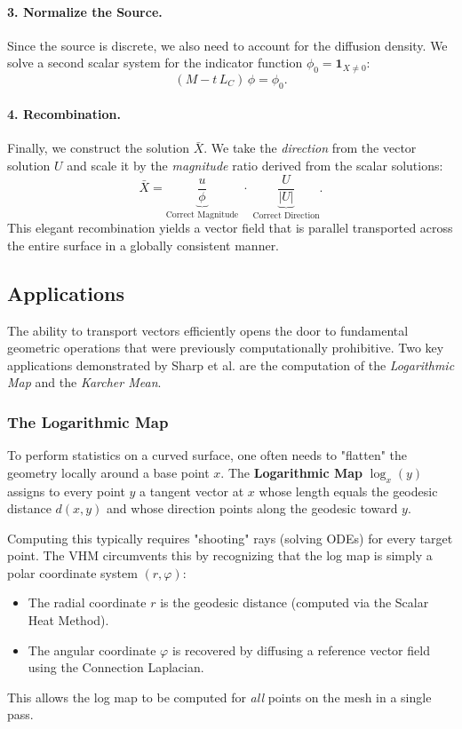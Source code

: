 \documentclass[11pt,a4paper]{article}
\begin{document}
\paragraph{3. Normalize the Source.}
Since the source is discrete, we also need to account for the diffusion density. We solve a second scalar system for the indicator function $\phi_0 = \mathbf{1}_{X\neq0}$:
\[
(M - t\,L_C)\,\phi = \phi_0.
\]

\paragraph{4. Recombination.}
Finally, we construct the solution $\bar{X}$. We take the \textit{direction} from the vector solution $U$ and scale it by the \textit{magnitude} ratio derived from the scalar solutions:
\[
\bar X = \underbrace{\frac{u}{\phi}}_{\text{Correct Magnitude}} \;\cdot\; \underbrace{\frac{U}{|U|}}_{\text{Correct Direction}}.
\]
This elegant recombination yields a vector field that is parallel transported across the entire surface in a globally consistent manner.

\subsection{Applications}

The ability to transport vectors efficiently opens the door to fundamental geometric operations that were previously computationally prohibitive. Two key applications demonstrated by Sharp et al. are the computation of the \textit{Logarithmic Map} and the \textit{Karcher Mean}.

\subsubsection{The Logarithmic Map}

To perform statistics on a curved surface, one often needs to "flatten" the geometry locally around a base point $x$. The \textbf{Logarithmic Map} $\log_x(y)$ assigns to every point $y$ a tangent vector at $x$ whose length equals the geodesic distance $d(x,y)$ and whose direction points along the geodesic toward $y$.

Computing this typically requires "shooting" rays (solving ODEs) for every target point. The VHM circumvents this by recognizing that the log map is simply a polar coordinate system $(r, \varphi)$:
\begin{itemize}[nosep]
    \item The radial coordinate $r$ is the geodesic distance (computed via the Scalar Heat Method).
    \item The angular coordinate $\varphi$ is recovered by diffusing a reference vector field using the Connection Laplacian.
\end{itemize}
This allows the log map to be computed for \textit{all} points on the mesh in a single pass.
\end{document}
